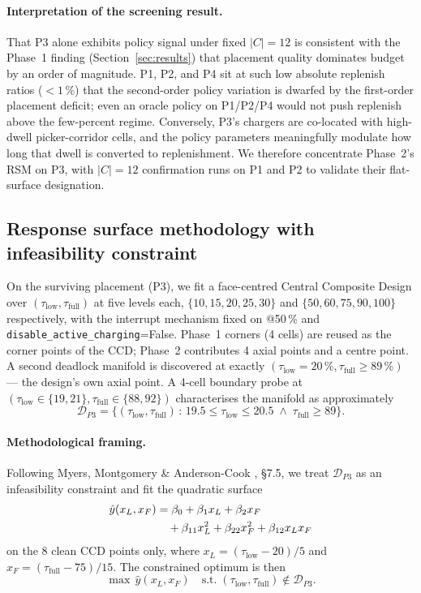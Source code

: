 \documentclass[conference]{IEEEtran}
\begin{document}
\paragraph{Interpretation of the screening result.}
That P3 alone exhibits policy signal under fixed $|C|=12$ is consistent with the Phase~1 finding (Section~\ref{sec:results}) that placement quality dominates budget by an order of magnitude. P1, P2, and P4 sit at such low absolute replenish ratios ($<1\,\%$) that the second-order policy variation is dwarfed by the first-order placement deficit; even an oracle policy on P1/P2/P4 would not push replenish above the few-percent regime. Conversely, P3's chargers are co-located with high-dwell picker-corridor cells, and the policy parameters meaningfully modulate how long that dwell is converted to replenishment. We therefore concentrate Phase~2's RSM on P3, with $|C|=12$ confirmation runs on P1 and P2 to validate their flat-surface designation.

\subsection{Response surface methodology with infeasibility constraint}
On the surviving placement (P3), we fit a face-centred Central Composite Design over $(\tau_\text{low}, \tau_\text{full})$ at five levels each, $\{10, 15, 20, 25, 30\}$ and $\{50, 60, 75, 90, 100\}$ respectively, with the interrupt mechanism fixed on @50\,\% and \texttt{disable\_active\_charging}=False. Phase~1 corners (4 cells) are reused as the corner points of the CCD; Phase~2 contributes 4 axial points and a centre point. A second deadlock manifold is discovered at exactly $(\tau_\text{low} = 20\,\%, \tau_\text{full} \ge 89\,\%)$ --- the design's own axial point. A 4-cell boundary probe at $(\tau_\text{low} \in \{19, 21\}, \tau_\text{full} \in \{88, 92\})$ characterises the manifold as approximately
\begin{equation}
  \mathcal{D}_{P3} = \{(\tau_\text{low}, \tau_\text{full}) \,:\, 19.5 \le \tau_\text{low} \le 20.5 \;\wedge\; \tau_\text{full} \ge 89\}.
\end{equation}

\paragraph{Methodological framing.} Following Myers, Montgomery \& Anderson-Cook \cite{myers2016}, \S7.5, we treat $\mathcal{D}_{P3}$ as an infeasibility constraint and fit the quadratic surface
\begin{align}
  \hat{y}(x_L, x_F) &= \beta_0 + \beta_1 x_L + \beta_2 x_F \\
                    &\quad + \beta_{11} x_L^2 + \beta_{22} x_F^2 + \beta_{12} x_L x_F \notag
\end{align}
on the 8 clean CCD points only, where $x_L = (\tau_\text{low} - 20)/5$ and $x_F = (\tau_\text{full} - 75)/15$. The constrained optimum is then
\begin{equation}
  \max\,\hat{y}(x_L, x_F) \quad \text{s.t.}\; (\tau_\text{low}, \tau_\text{full}) \notin \mathcal{D}_{P3}.
\end{equation}
\end{document}
